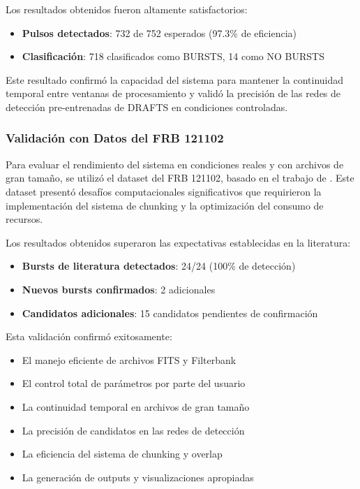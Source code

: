 Los resultados obtenidos fueron altamente satisfactorios:
\begin{itemize}
    \item \textbf{Pulsos detectados}: 732 de 752 esperados (97.3\% de eficiencia)
    \item \textbf{Clasificación}: 718 clasificados como BURSTS, 14 como NO BURSTS
\end{itemize}

Este resultado confirmó la capacidad del sistema para mantener la continuidad temporal entre ventanas de procesamiento y validó la precisión de las redes de detección pre-entrenadas de DRAFTS en condiciones controladas.

\subsubsection{Validación con Datos del FRB 121102}

Para evaluar el rendimiento del sistema en condiciones reales y con archivos de gran tamaño, se utilizó el dataset del FRB 121102, basado en el trabajo de \cite{cruces2020frb121102}. Este dataset presentó desafíos computacionales significativos que requirieron la implementación del sistema de chunking y la optimización del consumo de recursos.

Los resultados obtenidos superaron las expectativas establecidas en la literatura:
\begin{itemize}
    \item \textbf{Bursts de literatura detectados}: 24/24 (100\% de detección)
    \item \textbf{Nuevos bursts confirmados}: 2 adicionales
    \item \textbf{Candidatos adicionales}: 15 candidatos pendientes de confirmación
\end{itemize}

Esta validación confirmó exitosamente:
\begin{itemize}
    \item El manejo eficiente de archivos FITS y Filterbank
    \item El control total de parámetros por parte del usuario
    \item La continuidad temporal en archivos de gran tamaño
    \item La precisión de candidatos en las redes de detección
    \item La eficiencia del sistema de chunking y overlap
    \item La generación de outputs y visualizaciones apropiadas
\end{itemize}

